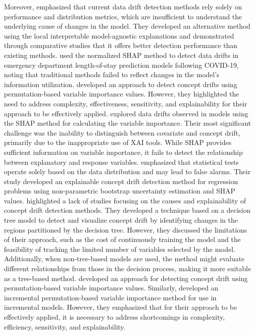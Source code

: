 \documentclass[pdflatex,sn-mathphys-ay]{sn-jnl}%
\theoremstyle{thmstyleone}%
\theoremstyle{thmstyletwo}%
\theoremstyle{thmstylethree}%
\begin{document}
Moreover, \cite{demvsar_and_bosnic_2018} emphasized that current data drift detection methods rely solely on performance and distribution metrics, which are insufficient to understand the underlying cause of changes in the model. They developed an alternative method using the local interpretable model-agnostic explanations \citep{strumbelj_et_al_2009} and demonstrated through comparative studies that it offers better detection performance than existing methods. \cite{duckworth_et_al_2021} used the normalized SHAP method \citep{lundberg_2017} to detect data drifts in emergency department length-of-stay prediction models following COVID-19, noting that traditional methods failed to reflect changes in the model's information utilization. \cite{muschalik_et_al_2022} developed an approach to detect concept drifts using permutation-based variable importance \citep{breiman2001random} values. However, they highlighted the need to address complexity, effectiveness, sensitivity, and explainability for their approach to be effectively applied. \cite{rahmani_et_al_2023} explored data drifts observed in models using the SHAP method for calculating the variable importance. Their most significant challenge was the inability to distinguish between covariate and concept drift, primarily due to the inappropriate use of XAI tools. While SHAP provides sufficient information on variable importance, it fails to detect the relationship between explanatory and response variables. \cite{mougan_and_nielsen_2023} emphasized that statistical tests operate solely based on the data distribution and may lead to false alarms. Their study developed an explainable concept drift detection method for regression problems using non-parametric bootstrap uncertainty estimation and SHAP values. \cite{mattos_et_al_2021} highlighted a lack of studies focusing on the causes and explainability of concept drift detection methods. They developed a technique based on a decision tree model to detect and visualize concept drift by identifying changes in the regions partitioned by the decision tree. However, they discussed the limitations of their approach, such as the cost of continuously training the model and the feasibility of tracking the limited number of variables selected by the model. Additionally, when non-tree-based models are used, the method might evaluate different relationships from those in the decision process, making it more suitable as a tree-based method. \cite{muschalik_et_al_2022} developed an approach for detecting concept drift using permutation-based variable importance values. Similarly, \cite{fumagalli_et_al_2023} developed an incremental permutation-based variable importance method for use in incremental models. However, they emphasized that for their approach to be effectively applied, it is necessary to address shortcomings in complexity, efficiency, sensitivity, and explainability.
\end{document}
